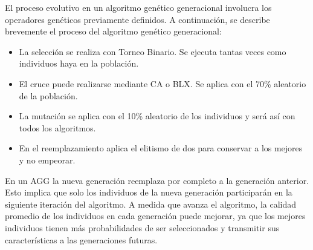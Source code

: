 	El proceso evolutivo en un algoritmo genético generacional involucra los operadores genéticos previamente definidos.  A continuación, se describe brevemente el proceso del algoritmo genético generacional:
	\begin{itemize}
		\item La selección se realiza con Torneo Binario. Se ejecuta tantas veces como individuos haya en la población.
		\item El cruce puede realizarse mediante CA o BLX. Se aplica con el 70\% aleatorio de la población.
		\item La mutación se aplica con el 10\% aleatorio de los individuos y será así con todos los algoritmos.
		\item En el reemplazamiento aplica el elitismo de dos para conservar a los mejores y no empeorar.
	\end{itemize}
	
	En un AGG la nueva generación reemplaza por completo a la generación anterior. Esto implica que solo los individuos de la nueva generación participarán en la siguiente iteración del algoritmo. A medida que avanza el algoritmo, la calidad promedio de los individuos en cada generación puede mejorar, ya que los mejores individuos tienen más probabilidades de ser seleccionados y transmitir sus características a las generaciones futuras.
	
